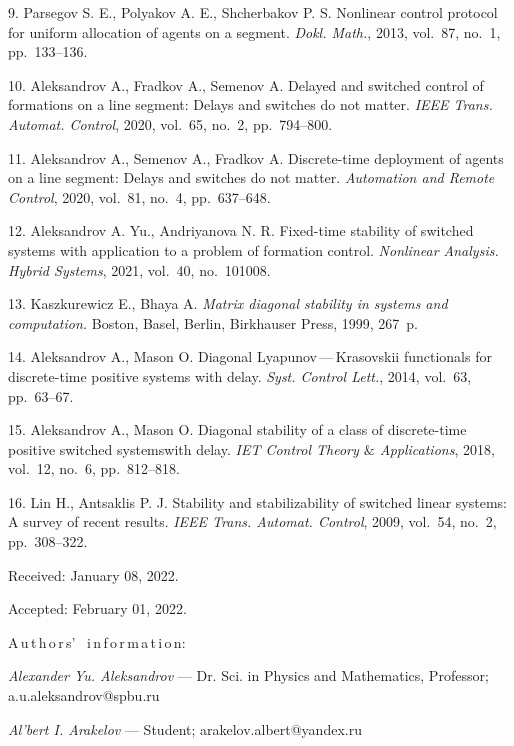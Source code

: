 {9. Parsegov S. E., Polyakov A. E.,  Shcherbakov P. S.
   Nonlinear control protocol for uniform allocation
of agents on a segment. {\it Dokl. Math.}, 2013, vol.~87, no.~1,  pp.~133--136.





10. Aleksandrov  A., Fradkov A.,  Semenov A.
   Delayed and switched control of formations on a line segment:
Delays and switches do not matter.
  {\it IEEE Trans. Automat. Control}, 2020, vol.~65, no.~2, pp.~794--800.


11. Aleksandrov  A., Semenov A.,  Fradkov A.
   Discrete-time deployment of agents on a line segment:
Delays and switches do not matter.
  {\it Automation and Remote Control}, 2020, vol.~81, no.~4, pp.~637--648.



12. Aleksandrov A. Yu.,  Andriyanova N. R.
  Fixed-time stability of switched systems with application to a
problem of formation control.
  {\it Nonlinear Analysis. Hybrid Systems}, 2021, vol.~40, no.~101008. 	


13. Kaszkurewicz E.,   Bhaya A.
{\it Matrix diagonal stability in systems and computation.}
   Boston, Basel, Berlin, Birkhauser Press, 1999, 267~p.


14. Aleksandrov A., Mason O.
   Diagonal Lya\-pu\-nov\,---\,Kra\-sov\-skii functionals for discrete-time
positive systems with delay.
   {\it Syst. Control Lett.}, 2014, vol.~63, pp.~63--67.


15. Aleksandrov A.,  Mason O.
  Diagonal stability of a class of discrete-time positive switched
systemswith delay.
  {\it IET Control Theory $\&$ Applications}, 2018, vol.~12, no.~6,
pp.~812--818.


16. Lin H.,   Antsaklis P. J.
   Stability and stabilizability of switched linear systems:
A survey of recent results.
  {\it IEEE Trans. Automat. Control}, 2009, vol.~54, no.~2, pp.~308--322.

\vskip 1.5mm

%


Received:  January 08, 2022.

Accepted: February 01, 2022.

\vskip 6mm


A\,u\,t\,h\,o\,r\,s' \ i\,n\,f\,o\,r\,m\,a\,t\,i\,o\,n:


\vskip 2mm \textit{Alexander Yu. Aleksandrov} --- Dr. Sci. in Physics and
Mathematics, Professor;\\ a.u.aleksandrov@spbu.ru \par

\vskip 2mm \textit{Al'bert I. Arakelov} --- Student;  arakelov.albert@yandex.ru \par
%
}
